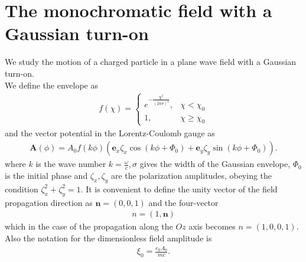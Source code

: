 \section{The monochromatic field with a Gaussian turn-on}\label{sec:smooth-mono-field}
We study the motion of a charged particle in a plane wave field with a Gaussian turn-on.\\
We define the envelope as
\begin{align}
    f(\chi)= \begin{cases}e^{-\frac{\chi^{2}}{(2 \pi \sigma)^{2}}}, & \chi<\chi_{0}  \label{I.1.3.1}\\ 1, & \chi \geq \chi_{0}\end{cases}
\end{align}
and the vector potential in the Lorentz-Coulomb gauge as
\begin{align}
    \mathbf{A}(\phi)=A_{0} f(k \phi)\left(\mathbf{e}_{x} \zeta_{x} \cos \left(k \phi+\Phi_{0}\right)+\mathbf{e}_{y} \zeta_{y} \sin \left(k \phi+\Phi_{0}\right)\right) . \label{I.1.3.2}
\end{align}
where $k$ is the wave number $k=\frac{\omega}{c}, \sigma$ gives the width of the Gaussian envelope, $\Phi_{0}$ is the initial phase and $\zeta_{x}, \zeta_{y}$ are the polarization amplitudes, obeying the condition $\zeta_{x}^{2}+\zeta_{y}^{2}=1$.
It is convenient to define the unity vector of the field propagation direction as $\mathbf{n}=(0,0,1)$ and the four-vector
\begin{align}
    n=(1, \mathbf{n}) \label{I.1.3.3}
\end{align}
which in the case of the propagation along the $O z$ axis becomes $n=(1,0,0,1)$. Also the notation for the dimensionless field amplitude is
\begin{align}
    \xi_{0}=\frac{e_{0} A_{0}}{m c} . \label{I.1.3.4}
\end{align}
